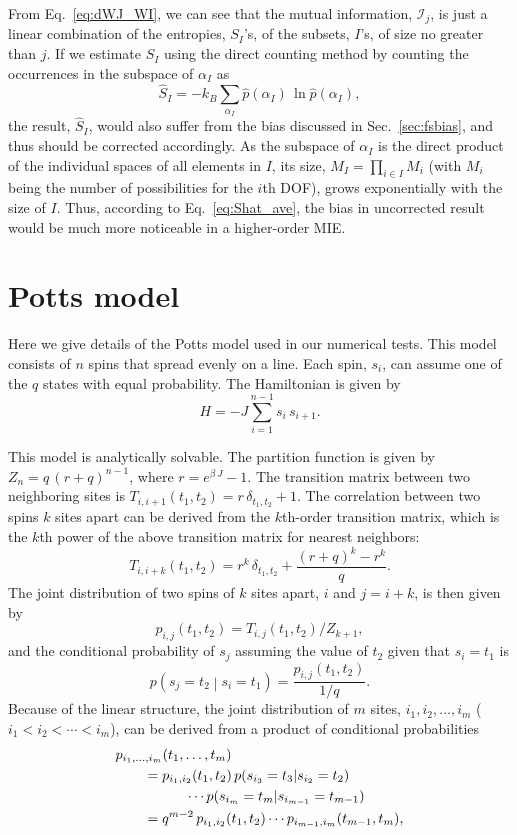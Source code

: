 \documentclass[reprint, superscriptaddress]{revtex4-1}
\newcommand{\MI}{\mathcal I} %
\begin{document}
From Eq.~\eqref{eq:dWJ_WI},
we can see that the mutual information, $\MI_j$, is just a linear combination
of the entropies, $S_I$'s,
of the subsets, $I$'s, of size no greater than $j$.
%
If we estimate $S_I$ using the direct counting method
by counting the occurrences in the subspace of $\alpha_I$ as
$$
\hat S_I = - k_B \sum_{\alpha_I} \hat p(\alpha_I) \, \ln \hat p(\alpha_I),
$$
the result, $\hat S_I$, would also suffer from the bias discussed
in Sec.~\ref{sec:fsbias}, and thus should be corrected accordingly.
%
As the subspace of $\alpha_I$ is the direct product of
the individual spaces of all elements in $I$,
its size, $M_I = \prod_{i \in I} M_i$
(with $M_i$ being the number of possibilities for the $i$th DOF),
grows exponentially with the size of $I$.
%
Thus, according to Eq.~\eqref{eq:Shat_ave},
the bias in uncorrected result would be much more noticeable
in a higher-order MIE.




\section{\label{sec:Potts}
Potts model
}

Here we give details of the Potts model used in our numerical tests.
%
This model consists of $n$ spins that spread evenly on a line.
%
Each spin, $s_i$, can assume one of the $q$ states with equal probability.
%
The Hamiltonian is given by
$$
H = -J \sum_{i = 1}^{n-1} s_i \, s_{i+1}.
$$

This model is analytically solvable. %
%
The partition function is given by
$Z_n = q \, (r + q)^{n-1}$,
where $r = e^{\beta \, J} - 1$.
%
The transition matrix between two neighboring sites is
$T_{i,i+1}(t_1, t_2) = r \, \delta_{t_1, t_2} + 1$.
%
The correlation between two spins $k$ sites apart
can be derived from the $k$th-order transition matrix,
which is the $k$th power of the above transition matrix
for nearest neighbors:
$$
T_{i,i+k}(t_1, t_2) = r^k \, \delta_{t_1, t_2}
+ \frac{ (r + q)^k - r^k } { q }.
$$
The joint distribution of two spins of $k$ sites apart, $i$ and $j = i+k$,
is then given by
\begin{equation}
p_{i, j}(t_1, t_2) = T_{i, j}(t_1, t_2) / Z_{k+1},
  \label{eq:Potts_pij}
\end{equation}
and the conditional probability of $s_j$ assuming the value of $t_2$
given that $s_i = t_1$ is
$$
p\left(s_j = t_2 \middle| s_i = t_1 \right) = \frac{ p_{i, j}(t_1, t_2) } { 1/q }.
$$
Because of the linear structure,
the joint distribution of $m$ sites, $i_1, i_2, \dots, i_m$
($i_1 < i_2 < \cdots < i_m$),
can be derived from a product of conditional probabilities
\begin{align}
  &p_{i_1, \dots, i_m}(t_1,\dots,t_m)\
  \notag\\
  &\qquad
  = p_{i_1, i_2}(t_1,t_2) \,
  p(s_{i_3} = t_3 | s_{i_2} = t_2)
  \notag\\
  &\qquad \qquad \quad \cdots
  p(s_{i_{m}} = t_{m} | s_{i_{m-1}} = t_{m-1})
  \notag\\
  &\qquad
  =
  q^{m-2} \, p_{i_1, i_2}(t_1,t_2) \cdots p_{i_{m-1}, i_m}(t_{m-1}, t_m)
  ,
  \label{eq:Potts_jointp}
\end{align}
\end{document}
